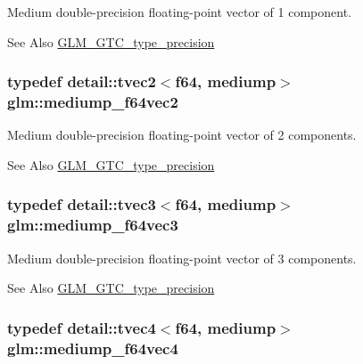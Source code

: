 Medium double-\/precision floating-\/point vector of 1 component. \begin{DoxySeeAlso}{See Also}
\hyperlink{group__gtc__type__precision}{G\-L\-M\-\_\-\-G\-T\-C\-\_\-type\-\_\-precision} 
\end{DoxySeeAlso}
\hypertarget{group__gtc__type__precision_ga892891863b8e50195e3e48077a329335}{
\subsubsection[{mediump\-\_\-f64vec2}]{\setlength{\rightskip}{0pt plus 5cm}typedef detail\-::tvec2$<$f64, mediump$>$ {\bf glm\-::mediump\-\_\-f64vec2}}}\label{group__gtc__type__precision_ga892891863b8e50195e3e48077a329335}
Medium double-\/precision floating-\/point vector of 2 components. \begin{DoxySeeAlso}{See Also}
\hyperlink{group__gtc__type__precision}{G\-L\-M\-\_\-\-G\-T\-C\-\_\-type\-\_\-precision} 
\end{DoxySeeAlso}
\hypertarget{group__gtc__type__precision_gae2832f9acbf0cc1071fcf93336db6e0c}{
\subsubsection[{mediump\-\_\-f64vec3}]{\setlength{\rightskip}{0pt plus 5cm}typedef detail\-::tvec3$<$f64, mediump$>$ {\bf glm\-::mediump\-\_\-f64vec3}}}\label{group__gtc__type__precision_gae2832f9acbf0cc1071fcf93336db6e0c}
Medium double-\/precision floating-\/point vector of 3 components. \begin{DoxySeeAlso}{See Also}
\hyperlink{group__gtc__type__precision}{G\-L\-M\-\_\-\-G\-T\-C\-\_\-type\-\_\-precision} 
\end{DoxySeeAlso}
\hypertarget{group__gtc__type__precision_ga0e011facac062fd7fb9b40c7d8288310}{
\subsubsection[{mediump\-\_\-f64vec4}]{\setlength{\rightskip}{0pt plus 5cm}typedef detail\-::tvec4$<$f64, mediump$>$ {\bf glm\-::mediump\-\_\-f64vec4}}}\label{group__gtc__type__precision_ga0e011facac062fd7fb9b40c7d8288310}
